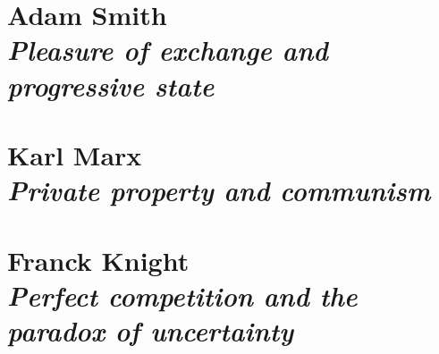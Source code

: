 \documentclass[dvipsnames,12pt]{book}
\begin{document}
        

    \chapter[Pleasure of exchange and progressive state]{Adam Smith \\[0.6cm] \textit{Pleasure of exchange and progressive state}}

        

    \chapter[Private property and communism]{Karl Marx \\[0.6cm] \textit{Private property and communism}}

    \chapter[Perfect competition and paradox of uncertainty]{Franck Knight\\[0.6cm] \textit{Perfect competition and the paradox of uncertainty}}

    
\end{document}
